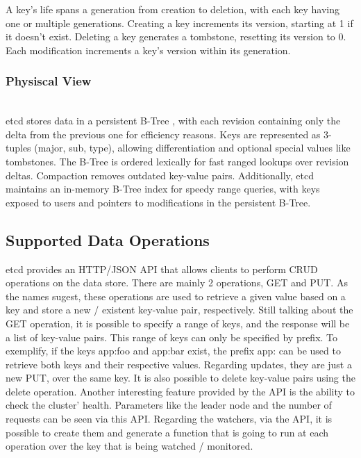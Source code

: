 \documentclass[screen,review]{acmart}
\begin{document}
A key's life spans a generation from creation to deletion, with each key having one or multiple generations. Creating a key increments its version, starting at 1 if it doesn't exist. Deleting a key generates a tombstone, resetting its version to 0. Each modification increments a key's version within its generation. \\

\subsubsection{Physiscal View}~\\
etcd stores data in a persistent B-Tree \cite{b-tree}, with each revision containing only the delta from the previous one for efficiency reasons. Keys are represented as 3-tuples (major, sub, type), allowing differentiation and optional special values like tombstones. The B-Tree is ordered lexically for fast ranged lookups over revision deltas. Compaction removes outdated key-value pairs. Additionally, etcd maintains an in-memory B-Tree index for speedy range queries, with keys exposed to users and pointers to modifications in the persistent B-Tree.

\subsection{Supported Data Operations}
etcd provides an HTTP/JSON API \cite{microsoft} that allows clients to perform CRUD operations on the data store.
There are mainly 2 operations, GET and PUT. As the names sugest, these operations are used to retrieve a given value based on a key and store a new / existent key-value pair, respectively.
Still talking about the GET operation, it is possible to specify a range of keys, and the response will be a list of key-value pairs. This range of keys can only be specified by prefix. To exemplify, if the keys app:foo and app:bar exist, the prefix app: can be used to retrieve both keys and their respective values.
Regarding updates, they are just a new PUT, over the same key.
It is also possible to delete key-value pairs using the delete operation.
Another interesting feature provided by the API is the ability to check the cluster' health. Parameters like the leader node and the number of requests can be seen via this API.
Regarding the watchers, via the API, it is possible to create them and generate a function that is going to run at each operation over the key that is being watched / monitored\cite{etcd_api}.
\end{document}
